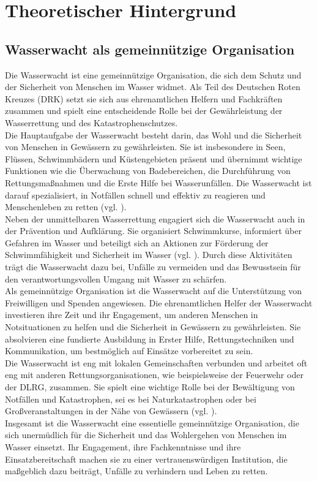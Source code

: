 \documentclass[fontsize=12pt,openright,oneside,paper=a4,BCOR=1cm]{scrbook}
\begin{document}
%
%

\chapter{Theoretischer Hintergrund}

\section{Wasserwacht als gemeinnützige Organisation}

Die Wasserwacht ist eine gemeinnützige Organisation, die sich dem Schutz und der Sicherheit von Menschen im Wasser widmet. Als Teil des Deutschen Roten Kreuzes (DRK) setzt sie sich aus ehrenamtlichen Helfern und Fachkräften zusammen und spielt eine entscheidende Rolle bei der Gewährleistung der Wasserrettung und des Katastrophenschutzes. \\
Die Hauptaufgabe der Wasserwacht besteht darin, das Wohl und die Sicherheit von Menschen in Gewässern zu gewährleisten. Sie ist insbesondere in Seen, Flüssen, Schwimmbädern und Küstengebieten präsent und übernimmt wichtige Funktionen wie die Überwachung von Badebereichen, die Durchführung von Rettungsmaßnahmen und die Erste Hilfe bei Wasserunfällen. Die Wasserwacht ist darauf spezialisiert, in Notfällen schnell und effektiv zu reagieren und Menschenleben zu retten (vgl. \cite{drkwasserwacht}). \\
Neben der unmittelbaren Wasserrettung engagiert sich die Wasserwacht auch in der Prävention und Aufklärung. Sie organisiert Schwimmkurse, informiert über Gefahren im Wasser und beteiligt sich an Aktionen zur Förderung der Schwimmfähigkeit und Sicherheit im Wasser (vgl. \cite{drkwasserwachtangebote}). Durch diese Aktivitäten trägt die Wasserwacht dazu bei, Unfälle zu vermeiden und das Bewusstsein für den verantwortungsvollen Umgang mit Wasser zu schärfen. \\
Als gemeinnützige Organisation ist die Wasserwacht auf die Unterstützung von Freiwilligen und Spenden angewiesen. Die ehrenamtlichen Helfer der Wasserwacht investieren ihre Zeit und ihr Engagement, um anderen Menschen in Notsituationen zu helfen und die Sicherheit in Gewässern zu gewährleisten. Sie absolvieren eine fundierte Ausbildung in Erster Hilfe, Rettungstechniken und Kommunikation, um bestmöglich auf Einsätze vorbereitet zu sein. \\
Die Wasserwacht ist eng mit lokalen Gemeinschaften verbunden und arbeitet oft eng mit anderen Rettungsorganisationen, wie beispielsweise der Feuerwehr oder der DLRG, zusammen. Sie spielt eine wichtige Rolle bei der Bewältigung von Notfällen und Katastrophen, sei es bei Naturkatastrophen oder bei Großveranstaltungen in der Nähe von Gewässern (vgl. \cite{brkwasserwacht}). \\
Insgesamt ist die Wasserwacht eine essentielle gemeinnützige Organisation, die sich unermüdlich für die Sicherheit und das Wohlergehen von Menschen im Wasser einsetzt. Ihr Engagement, ihre Fachkenntnisse und ihre Einsatzbereitschaft machen sie zu einer vertrauenswürdigen Institution, die maßgeblich dazu beiträgt, Unfälle zu verhindern und Leben zu retten.
\end{document}
